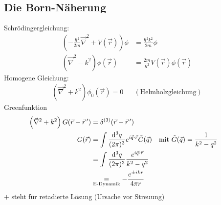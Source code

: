 \subsection{Die Born-Näherung}
	Schrödingergleichung:
		\begin{align*}
			\left(- \frac{\hbar^2}{2 m} \vec{\nabla}^2 + V (\vec{r})\right) \phi
			&= \frac{\hbar^2 k^2}{2m} \phi \\
			\left(\vec{\nabla}^2 - k^2\right) \phi(\vec{r}) 
			&= \frac{2m}{\hbar^2} V (\vec{r}) \phi (\vec{r})
		\end{align*}
	Homogene Gleichung:
		\begin{align*}
			\left(\vec{\nabla}^2 + k^2 \right) \phi_0 (\vec{r}) = 0 &
			&(\text{Helmholzgleichung}) 
		\end{align*}
	Greenfunktion
		\begin{align*}
			\left(\vec{\nabla}^2 + k^2 \right) G (\vec{r} - \vec{r}\,') 
			&= \delta^{(3)}(\vec{r} - \vec{r}\,') \\
			G(\vec{r}) &= 
			\int \frac{\mathrm{d}^3 q}{(2 \pi)^3} e^{i \vec{q} \cdot \vec{r}} \tilde{G}(\vec{q})
			&\text{mit } \tilde{G} (\vec{q}) &= \frac{1}{k^2-q^2} \\
			&= \int \frac{\mathrm{d}^3 q}{(2 \pi)^3} \frac{e^{i \vec{q} \cdot \vec{r}}}{k^2 - q^2} \\
			&\underset{\text{E-Dynamik}}{=} - \frac{e^{\pm i k r}}{4 \pi r}
		\end{align*}
	$+$ steht für retadierte Lösung (Ursache vor Streuung)
	
